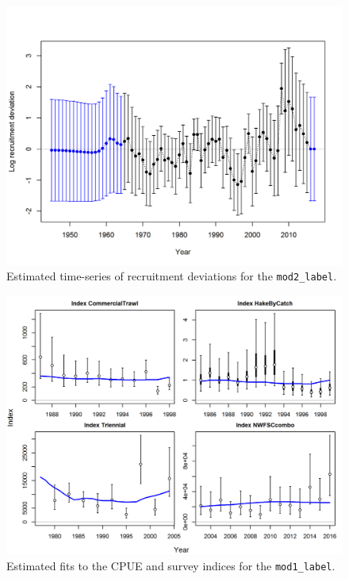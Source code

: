 \documentclass[12pt,]{article}
\begin{document}
\begin{figure}[htbp]
\centering
\includegraphics{r4ss/plots_mod2/recdevs2_withbars.png}
\caption{Estimated time-series of recruitment deviations for the
\texttt{mod2\_label}. \label{fig:recdevs2}}
\end{figure}

\FloatBarrier

\begin{figure}[htbp]
\centering
\includegraphics{r4ss/plots_mod1/index0_all_indices_fit.png}
\caption{Estimated fits to the CPUE and survey indices for the
\texttt{mod1\_label}. \label{fig:index_fits1}}
\end{figure}
\end{document}
